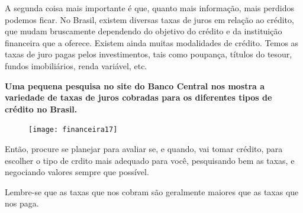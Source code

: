 A segunda coisa mais importante é que, quanto mais informação, mais perdidos podemos ficar. No Brasil, existem diversas taxas de juros em relação ao crédito, que mudam bruscamente dependendo do objetivo do crédito e da instituição financeira que a oferece. Existem ainda muitas modalidades de crédito. Temos as taxas de juro pagas pelos investimentos, tais como poupança, títulos do tesour, fundos imobiliários, renda variável, etc.

\textbf{Uma pequena pesquisa no site do Banco Central nos mostra a variedade de taxas de juros cobradas para os diferentes tipos de crédito no Brasil.}

\begin{figure}[H]
\centering

\texttt{[image: financeira17]}
\end{figure}

Então, procure se planejar para avaliar se, e quando, vai tomar crédito, para escolher o tipo de crdito mais adequado para você, pesquisando bem as taxas, e negociando valores sempre que possível.

Lembre-se que as taxas que nos cobram são geralmente maiores que as taxas que nos paga.

\clearpage

\def\currentcolor{session2}

